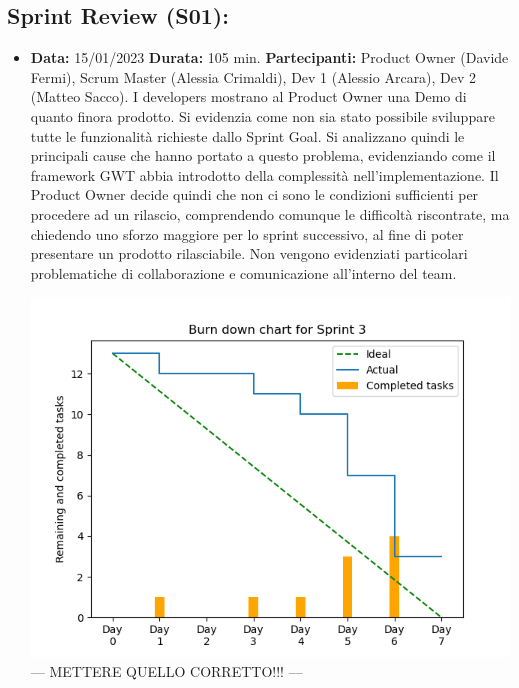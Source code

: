 \documentclass[a4paper, oneside]{article}
\newcommand\uno{Scrum Master (Alessia Crimaldi), Dev 1 (Alessio Arcara), Dev 2 (Matteo Sacco).}
\newcommand\unoP{Product Owner (Davide Fermi), }
\begin{document}
\begin{landscape}
        \newpage
        \normalsize
        \subsection{Sprint Review (S01):}
        \begin{itemize}
            \item \textbf{Data:} 15/01/2023
            \newline \textbf{Durata:} 105 min.
            \newline \textbf{Partecipanti:} \unoP \uno
            \newline
            \newline I developers mostrano al Product Owner una Demo di quanto finora prodotto. Si evidenzia come non sia stato possibile sviluppare tutte le funzionalità richieste dallo Sprint Goal. Si analizzano quindi le principali cause che hanno portato a questo problema, evidenziando come il framework GWT abbia introdotto della complessità nell'implementazione. Il Product Owner decide quindi che non ci sono le condizioni sufficienti per procedere ad un rilascio, comprendendo comunque le difficoltà riscontrate, ma chiedendo uno sforzo maggiore per lo sprint successivo, al fine di poter presentare un prodotto rilasciabile. Non vengono evidenziati particolari problematiche di collaborazione e comunicazione all'interno del team.

            \includegraphics[scale=0.8]{Sprint03_BurnDownChart}
            --- METTERE QUELLO CORRETTO!!! ---

        \end{itemize}


\end{landscape}
\end{document}

